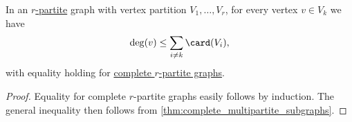 \begin{lemma}\label{thm:multipartite_graph_degree}
  In an \hyperref[def:multipartite_graph]{\( r \)-partite} graph with vertex partition \( V_1, \ldots, V_r \), for every vertex \( v \in V_k \) we have
  \begin{equation*}
    \deg(v) \leq \sum_{i \neq k} \card(V_i),
  \end{equation*}
  with equality holding for \hyperref[def:complete_multipartite_graph]{complete \( r \)-partite graphs}.
\end{lemma}
\begin{proof}
  Equality for complete \( r \)-partite graphs easily follows by induction. The general inequality then follows from \cref{thm:complete_multipartite_subgraphs}.
\end{proof}

